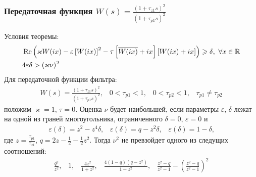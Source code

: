 \documentclass{beamer}
\begin{document}
\begin{frame}
\frametitle{Передаточная функция $W(s) = \frac{(1+\tau_{z1}s)^2}{(1+\tau_{p1}s)^2}$}
Условия теоремы:\vspace{-2mm}
 \begin{align*}
&\operatorname{Re}\left( \varkappa W(ix)- \varepsilon\left[W(ix)\right]^2-\tau\left[ \overline{W(ix)}+ix \right]\left[W(ix)+ix \right]\right) \geqslant \delta \text{,}\enskip\forall x \in \mathbb{R}\\
&4\varepsilon\delta > (\varkappa\nu)^2
\end{align*}
Для передаточной функции фильтра:\vspace{-2mm}
 \begin{align}\label{filter2}
W(s) = \frac{(1+\tau_{z1}s)^2}{(1+\tau_{p1}s)^2}\text{,} \quad0 < \tau_{p1} < 1 \text{,} \quad 0 < \tau_{p2} <1 \text{,} \quad \tau_{p1} \neq \tau_{p2}
 \end{align}
положим $\varkappa = 1$, $\tau = 0$. Оценка $\nu$ будет наибольшей, если параметры $\varepsilon$, $\delta$ лежат на одной из граней многоугольника, ограниченного $\delta = 0$, $\varepsilon = 0$ и \vspace{-2mm}
 \begin{equation*}
\begin{aligned}
\varepsilon(\delta)=z^2 - z^4\delta \text{,} \quad \varepsilon(\delta)=q - z^2\delta \text{,}
\quad \varepsilon(\delta)=1 - \delta \text{,}
\end{aligned}
\end{equation*}
где $z = \frac{\tau_{p1}}{\tau_{z1}}$, $q = 2z - \frac{1}{2} - \frac{1}{2}z^2$. 
Тогда $\nu^2$ не превзойдет одного из следущих соотношений:
\vspace{-2mm}
 \begin{equation}
\begin{aligned}
\frac{q^2}{z^2}\text{,} \quad 1 \text{,} \quad \frac{4z^2}{1+z^2} \text{,} \quad \frac{4(1-q)(q-z^2)}{1-z^2} \text{,} \quad \frac{z^2-q}{z^2-1} - \left(\frac{z^2-q}{z^2-1}\right)^2
\end{aligned}
\end{equation}
\end{frame}

\end{document}
